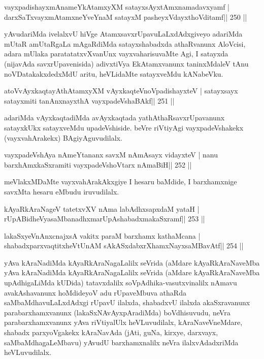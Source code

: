 \begin{shl}
vayxpadishayxmAnameYkAtamxyXM satayxsAyx\s\s tAmxnamadavxyamf |
darxSaTxvayxmAtamxneYveYnaM satayxM pasheyxVdayxthoVditamf\hfill || 250 ||
\end{shl}

\begin{artha}
yAvudariMda ivelalxvU hiVge AtamxsavxrUpavuLaLxdAdxgiveyo adariMda mUtaR amUtaRgaLa mAgaRdiMda satayxshabadxda athaRvanunx AloVcisi, adara mUlaka paratatatxvXvanUnx vayxvaharisuvaMte Agi, I satayxda (nijavAda savxrUpavenisida) adivxtiVya EkAtamxvanunx taninxMdaleV tAnu noVDatakakxdedxMdU aritu, heVLidaMte satayxveMdu kANabeVku.
\end{artha}

\begin{shl}
atoV\s vAyxkaqtayAthAtamxyXM vAyxkaqteVnoVpadishayxteV |
satayxsayx satayxmiti tanAnxnayxthA vayxpadeVshaBAkf\hfill || 251 ||
\end{shl}

\begin{artha}
adariMda vAyxkaqtadiMda avAyxkaqtada yathAthaRsavxrUpavanunx satayxkUkx satayxveMdu upadeVshiside. beVre riVtiyAgi vayxpadeVshakekx (vayxvahArakekx) BAgiyAguvudilalx.
\end{artha}

\begin{shl}
vayxpadeVshAya nAmeYtananx savxM nAmAsayx vidayxteV |
nanu barxhAmxkaSxramiti vayxpadeVshoV\s tarx nAmaBiH\hfill || 252 ||
\end{shl}

\begin{artha}
meVlakxMDaMte vayxvahArakAkxgiye I hesaru baMdide, I barxhamxnige
savxMta hesaru eMbudu iruvudilalx. 
\end{artha}


\begin{shl}
kAyaRkAraNageV tatetxvXV nAma labAdhxsapxdaM yataH |
rUpABidheVyasaMbanadhxmarUpAshabadxmakaSxramf\hfill || 253 ||
\end{shl}

\begin{shl}
lakaSxyeVnAnxcnajxsA vakitx paraM barxhamx kathaMcana |
shabadxparxvaqtitxheVtUnAM sAkASxdabxrXhamxNayxsaMBavAtf\hfill || 254 ||
\end{shl}

\begin{artha}
yAva kAraNadiMda kAyaRkAraNagaLalilx seVrida (aMdare kAyaRkAraNaveMba
yAva kAraNadiMda kAyaRkAraNagaLalilx seVrida (aMdare kAyaRkAraNaveMba
upAdhigaLiMda kUDida) tatavxdalilx soVpAdhika-vasutxvinalilx nAmavu
avakAshavanunx hoMdideyoV adu rUpaveMbuva athaRda
saMbaMdhavuLaLxdAdxgi rUpavU ilalxda, shabadxvU ilalxda akaSxravanunx
parabarxhamxvanunx (lakaSxNAvAyxpAradiMda) boVdhisuvudu, neVra
parabarxhamxvanunx yAva riVtiyalUlx heVLuvudilalx, kAraNaveVneMdare,
shabadx parxyoVgakekx kAraNavAda (jAti, guNa, kirxye, darxvayx,
saMbaMdhagaLeMbavu) yAvudU barxhamxnalilx neVra ilalxvAdadxriMda
heVLuvudilalx.
\end{artha}

